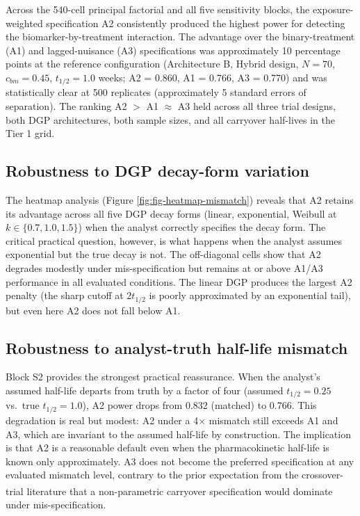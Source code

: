 \documentclass[
]{article}
\begin{document}
Across the 540-cell principal factorial and all five sensitivity
blocks, the exposure-weighted specification A2 consistently
produced the highest power for detecting the
biomarker-by-treatment interaction. The advantage over the
binary-treatment (A1) and lagged-nuisance (A3) specifications
was approximately 10 percentage points at the reference
configuration (Architecture B, Hybrid design, \(N = 70\),
\(c_{bm} = 0.45\), \(t_{1/2} = 1.0\) weeks; A2 = 0.860, A1 =
0.766, A3 = 0.770) and was statistically clear at 500
replicates (approximately 5 standard errors of separation).
The ranking A2 \(>\) A1 \(\approx\) A3 held across all three trial
designs, both DGP architectures, both sample sizes, and all
carryover half-lives in the Tier 1 grid.

\subsection{Robustness to DGP decay-form variation}\label{robustness-to-dgp-decay-form-variation}

The heatmap analysis (Figure \ref{fig:fig-heatmap-mismatch})
reveals that A2 retains its advantage across all five DGP decay
forms (linear, exponential, Weibull at \(k \in \{0.7, 1.0,
1.5\}\)) when the analyst correctly specifies the decay form.
The critical practical question, however, is what happens when
the analyst assumes exponential but the true decay is not. The
off-diagonal cells show that A2 degrades modestly under
mis-specification but remains at or above A1/A3 performance in
all evaluated conditions. The linear DGP produces the largest
A2 penalty (the sharp cutoff at \(2 t_{1/2}\) is poorly
approximated by an exponential tail), but even here A2 does not
fall below A1.

\subsection{Robustness to analyst-truth half-life mismatch}\label{robustness-to-analyst-truth-half-life-mismatch}

Block S2 provides the strongest practical reassurance. When the
analyst's assumed half-life departs from truth by a factor of
four (assumed \(t_{1/2} = 0.25\) vs.~true \(t_{1/2} = 1.0\)), A2
power drops from 0.832 (matched) to 0.766. This degradation is
real but modest: A2 under a 4\(\times\) mismatch still exceeds A1
and A3, which are invariant to the assumed half-life by
construction. The implication is that A2 is a reasonable default
even when the pharmacokinetic half-life is known only
approximately. A3 does not become the preferred specification
at any evaluated mismatch level, contrary to the prior
expectation from the crossover-trial literature\textsuperscript{} that a non-parametric carryover
specification would dominate under mis-specification.
\end{document}
